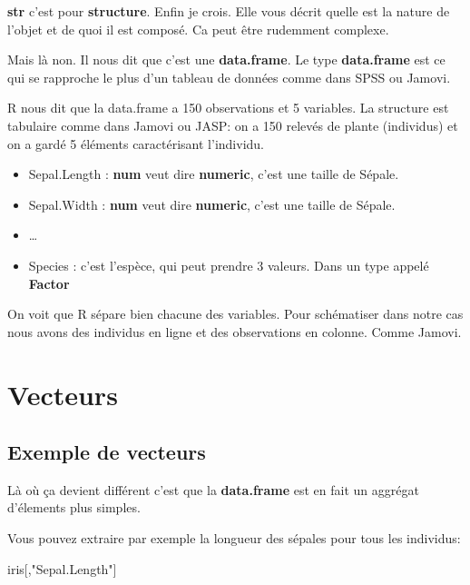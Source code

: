 \documentclass[
]{book}
\newenvironment{Shaded}{\begin{snugshade}}{\end{snugshade}}
\newcommand{\NormalTok}[1]{#1}
\newcommand{\StringTok}[1]{\textcolor[rgb]{0.31,0.60,0.02}{#1}}
\providecommand{\tightlist}{%
  \setlength{\itemsep}{0pt}\setlength{\parskip}{0pt}}
\begin{document}
\textbf{str} c'est pour \textbf{structure}. Enfin je crois. Elle vous décrit quelle est la
nature de l'objet et de quoi il est composé. Ca peut être rudemment complexe.

Mais là non. Il nous dit que c'est une \textbf{data.frame}. Le type \textbf{data.frame}
est ce qui se rapproche le plus d'un tableau de données comme dans SPSS ou Jamovi.

R nous dit que la data.frame a 150 observations et 5 variables. La structure est
tabulaire comme dans Jamovi ou JASP: on a 150 relevés de plante (individus) et
on a gardé 5 éléments caractérisant l'individu.

\begin{itemize}
\tightlist
\item
  Sepal.Length : \textbf{num} veut dire \textbf{numeric}, c'est une taille de Sépale.
\item
  Sepal.Width : \textbf{num} veut dire \textbf{numeric}, c'est une taille de Sépale.
\item
  \ldots{}
\item
  Species : c'est l'espèce, qui peut prendre 3 valeurs. Dans un type appelé
  \textbf{Factor}
\end{itemize}

On voit que R sépare bien chacune des variables. Pour schématiser dans notre cas
nous avons des individus en ligne et des observations en colonne. Comme Jamovi.

\hypertarget{vecteurs}{%
\section{Vecteurs}\label{vecteurs}}

\hypertarget{exemple-de-vecteurs}{%
\subsection{Exemple de vecteurs}\label{exemple-de-vecteurs}}

Là où ça devient différent c'est que la \textbf{data.frame} est en fait un aggrégat
d'élements plus simples.

Vous pouvez extraire par exemple la longueur des sépales pour tous les individus:

\begin{Shaded}
\begin{Highlighting}[]
\NormalTok{iris[,}\StringTok{"Sepal.Length"}\NormalTok{]}
\end{Highlighting}
\end{Shaded}
\end{document}

